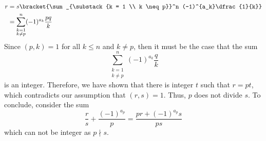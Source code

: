\begin{exercise}
\begin{solution}
\begin{align*}
            r &= s\bracket{\sum_{\substack{k = 1 \\ k \neq p}}^n (-1)^{a_k}\dfrac{1}{k}}\\
             &= \sum_{\substack{k = 1 \\ k \neq p}}^n (-1)^{a_k}\dfrac{pq}{k}
        \end{align*}
        Since \((p,k) = 1\) for all \(k \leq n\) and \(k \neq p\), then it must be the case that the sum
        \begin{equation*}
            \sum_{\substack{k = 1 \\ k \neq p}}^n (-1)^{a_k}\dfrac{q}{k}
        \end{equation*}
        is an integer. Therefore, we have shown that there is integer \(t\) such that \(r = pt\), which contradicts our assumption that \((r,s)  = 1\). Thus, \(p\) does not divide \(s\). To conclude, consider the sum 
        \begin{equation*}
            \dfrac{r}{s} + \dfrac{(-1)^{a_p}}{p} = \dfrac{pr + (-1)^{a_p}s}{ps}
        \end{equation*}
        which can not be integer as \(p \nmid s\).
    \end{solution}
\end{exercise}